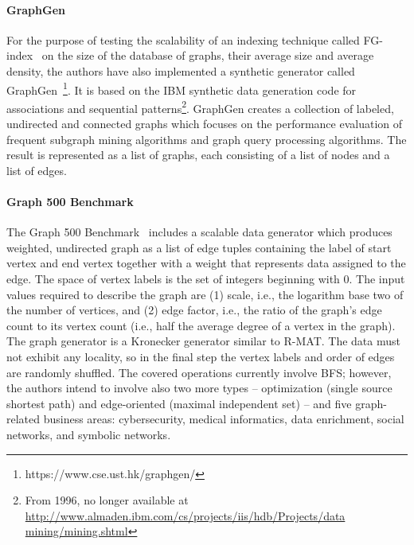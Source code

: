 \paragraph{GraphGen} For the purpose of testing the scalability of an indexing
technique called FG-index~\cite{Cheng:2007:FTV:1247480.1247574} on the size of the
database of graphs, their average size and average density, the authors have
also implemented a synthetic generator called
GraphGen~\footnote{https://www.cse.ust.hk/graphgen/}. It is
based on the IBM synthetic data generation code for associations and sequential
patterns\footnote{From 1996, no longer available at
\url{http://www.almaden.ibm.com/cs/projects/iis/hdb/Projects/data
mining/mining.shtml}}. GraphGen creates a collection of labeled, undirected and
connected graphs which focuses on the performance evaluation of frequent subgraph mining
algorithms and graph query processing algorithms. The result is represented as a
list of graphs, each consisting of a list of nodes and a list of edges.




\paragraph{Graph 500 Benchmark} The Graph 500 Benchmark~\cite{Graph500} includes
a scalable data generator which produces weighted, undirected graph as a list of
edge tuples containing the label of start vertex and end vertex together with a
weight that represents data assigned to the edge. The space of vertex  labels is
the set of integers beginning with 0. The input values required to describe the
graph are (1) scale, i.e., the logarithm base two of the number of vertices, and
(2) edge factor, i.e., the ratio of the graph's edge count to its vertex count
(i.e., half the average degree of a vertex in the graph). The graph generator is
a Kronecker generator similar to R-MAT. The data must not exhibit any locality,
so in the final step the vertex labels and order of edges are randomly shuffled.
The covered operations currently involve BFS; however, the authors intend to
involve also two more types -- optimization (single source shortest path) and
edge-oriented (maximal independent set) -- and five graph-related business areas:
cybersecurity, medical informatics, data enrichment, social networks, and
symbolic networks.

